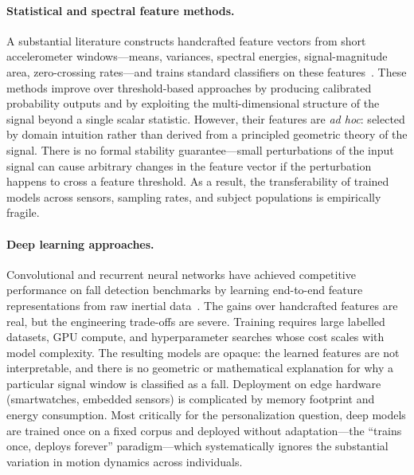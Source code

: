 \paragraph{Statistical and spectral feature methods.}
A substantial literature constructs handcrafted feature vectors from short
accelerometer windows---means, variances, spectral energies, signal-magnitude
area, zero-crossing rates---and trains standard classifiers on these
features~\parencite{igual2013challenges, delahoz2014survey}.  These methods improve over
threshold-based approaches by producing calibrated probability outputs and by
exploiting the multi-dimensional structure of the signal beyond a single scalar
statistic.  However, their features are \emph{ad hoc}: selected by domain intuition
rather than derived from a principled geometric theory of the signal.  There is
no formal stability guarantee---small perturbations of the input signal can cause
arbitrary changes in the feature vector if the perturbation happens to cross a
feature threshold.  As a result, the transferability of trained models across
sensors, sampling rates, and subject populations is empirically fragile.

\paragraph{Deep learning approaches.}
Convolutional and recurrent neural networks have achieved competitive performance on
fall detection benchmarks by learning end-to-end feature representations from raw
inertial data~\parencite{batchuluun2022deep, wang2020falldl}.  The gains over handcrafted
features are real, but the engineering trade-offs are severe.  Training requires large
labelled datasets, GPU compute, and hyperparameter searches whose cost scales with
model complexity.  The resulting models are opaque: the learned features are not
interpretable, and there is no geometric or mathematical explanation for why a
particular signal window is classified as a fall.  Deployment on edge hardware
(smartwatches, embedded sensors) is complicated by memory footprint and energy
consumption.  Most critically for the personalization question, deep models are
trained once on a fixed corpus and deployed without adaptation---the ``trains once,
deploys forever'' paradigm---which systematically ignores the substantial variation
in motion dynamics across individuals.


